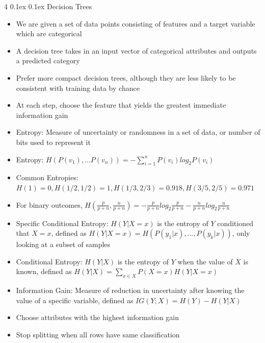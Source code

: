 \documentclass[10pt, landscape]{article}
\makeatletter
\renewcommand{\subsection}{\@startsection{subsection}{2}{0mm}%
  {0.1ex} %
  {0.1ex} %
  {\normalfont\normalsize\bfseries}}
\makeatother
\begin{document}
\begin{multicols*}{4}
\subsection{Decision Trees}
\begin{itemize}
    \item We are given a set of data points consisting of features and a target variable which are categorical
    \item A decision tree takes in an input vector of categorical attributes and outputs a predicted category
    \item Prefer more compact decision trees, although they are less likely to be consistent with training data by chance
    \item At each step, choose the feature that yields the greatest immediate information gain
    \item Entropy: Measure of uncertainty or randomness in a set of data, or number of bits used to represent it
    \item Entropy: $H(P(v_1),...P(v_n))=-\sum_{i=1}^nP(v_i)log_2P(v_i)$
    \item Common Entropies: $H(1)=0, H(1/2, 1/2)=1, H(1/3, 2/3)=0.918, H(3/5, 2/5)=0.971$
    \item For binary outcomes, $H(\frac{p}{p+n},\frac{n}{p+n})=-\frac{p}{p+n}log_2\frac{p}{p+n}-\frac{n}{p+n}log_2\frac{n}{p+n}$
    \item Specific Conditional Entropy: $H(Y|X=x)$ is the entropy of $Y$ conditioned that $X=x$, defined as $H(Y|X=x)=H(P(y_1 | x),...,P(y_k|x))$, only looking at a subset of samples
    \item Conditional Entropy: $H(Y|X)$ is the entropy of $Y$ when the value of $X$ is known, defined as $H(Y|X)=\sum_{x \in X}P(X=x)H(Y|X=x)$
    \item Information Gain: Measure of reduction in uncertainty after knowing the value of a specific variable, defined as $IG(Y;X)=H(Y)-H(Y|X)$
    \item Choose attributes with the highest information gain
    \item Stop splitting when all rows have same classification

\end{itemize}
\end{multicols*}
\end{document}
